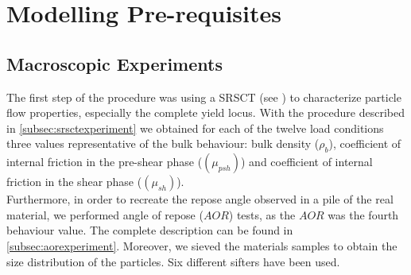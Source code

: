 \section{Modelling Pre-requisites}
\label{sec:modellingprerequisites}


\subsection{Macroscopic Experiments}
\label{subsec:Macroscopicexperiments}

The first step of the procedure was using a SRSCT (see \cite{RefWorks:142}) to characterize particle flow properties, 
especially the complete yield locus.
With the procedure described in \ref{subsec:srsctexperiment} we
obtained for each of the twelve load conditions three values representative of the bulk behaviour: bulk density ($\rho_b$),
coefficient of internal friction in the pre-shear phase ($ (\mu_{psh})$) and
coefficient of internal friction in the shear phase  ($ (\mu_{sh})$).\\
Furthermore, in order to recreate the repose angle observed in a pile of the real material, 
we performed angle of repose ($AOR$) tests, as the $AOR$ was the fourth
behaviour value. The complete description can be found in
\ref{subsec:aorexperiment}.
Moreover, we sieved the materials samples to obtain the size distribution of the
particles. Six different sifters have been used.\\

